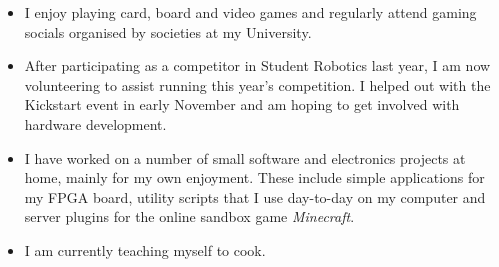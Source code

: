 
\begin{itemize}
\item I enjoy playing card, board and video games and regularly attend gaming socials organised by societies at my University.
\item After participating as a competitor in Student Robotics last year, I am now volunteering to assist running this year's competition. I helped out with the Kickstart event in early November and am hoping to get involved with hardware development.
\item I have worked on a number of small software and electronics projects at home, mainly for my own enjoyment. These include simple applications for my FPGA board, utility scripts that I use day-to-day on my computer and server plugins for the online sandbox game \emph{Minecraft}.
\item I am currently teaching myself to cook.
\end{itemize}
